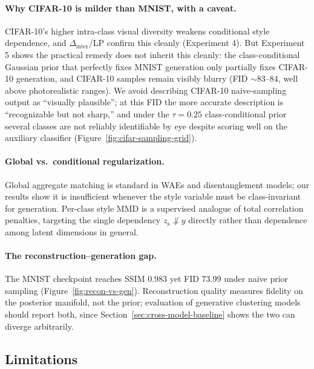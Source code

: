 \documentclass[10pt,letterpaper]{article}
\newcommand{\zs}{z_{\mathrm{s}}}
\begin{document}
\paragraph{Why CIFAR-10 is milder than MNIST, with a caveat.}
CIFAR-10's higher intra-class visual diversity weakens conditional style
dependence, and $\Delta_{\mathrm{inter}}$/LP confirm this cleanly
(Experiment 4). But Experiment 5 shows the practical remedy does not
inherit this cleanly: the class-conditional Gaussian prior that perfectly
fixes MNIST generation only partially fixes CIFAR-10 generation, and
CIFAR-10 samples remain visibly blurry (FID $\sim\!83$--$84$, well above
photorealistic ranges). We avoid describing CIFAR-10 naive-sampling output
as ``visually plausible''; at this FID the more accurate description is
``recognizable but not sharp,'' and under the $\tau{=}0.25$
class-conditional prior several classes are not reliably identifiable by
eye despite scoring well on the auxiliary classifier
(Figure~\ref{fig:cifar-sampling-grid}).

\paragraph{Global vs.\ conditional regularization.}
Global aggregate matching is standard in WAEs and disentanglement models;
our results show it is insufficient whenever the style variable must be
class-invariant for generation. Per-class style MMD is a supervised
analogue of total correlation penalties, targeting the single dependency
$\zs\not\perp y$ directly rather than dependence among latent dimensions in
general.

\paragraph{The reconstruction--generation gap.}
The MNIST checkpoint reaches SSIM $0.983$ yet FID $73.99$ under naive prior
sampling (Figure~\ref{fig:recon-vs-gen}). Reconstruction quality measures
fidelity on the posterior manifold, not the prior; evaluation of generative
clustering models should report both, since Section~\ref{sec:cross-model-baseline}
shows the two can diverge arbitrarily.

\subsection{Limitations}
\label{sec:limitations}
\end{document}
